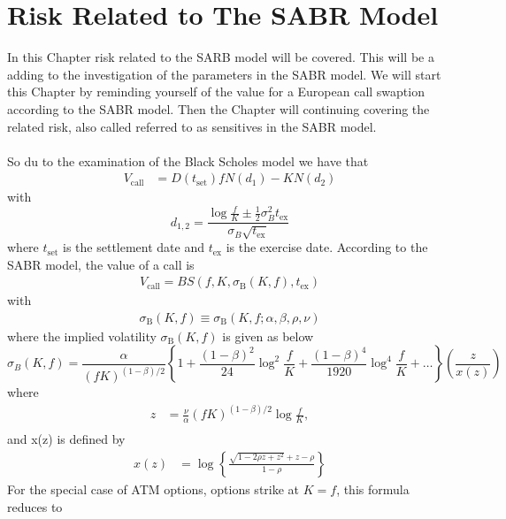 \section{Risk Related to The SABR Model} \label{risk_mang}
In this Chapter risk related to the SARB model will be covered. 
This will be a adding to the investigation of the parameters in the SABR model.
We will start this Chapter by  reminding yourself of the value for
a European call swaption according to the SABR model. 
Then the Chapter will continuing covering the related risk, also called referred to as sensitives in 
the SABR model. 
\\\\
So du to the examination of the Black Scholes model we have that \cite{Smile}
\begin{align}
    V_{\text{call}} &= D(t_{\text{set}})fN(d_1) - KN(d_2) \label{V_call} 
\end{align}
with
\begin{equation}
    d_{1,2} = \frac{\log \frac{f}{K} \pm \frac{1}{2}\sigma_B^2 t_{\text{ex}}}{\sigma_B \sqrt{t_{\text{ex}}}}
\end{equation}
where $t_{\text{set}}$ is the settlement date and $t_{\text{ex}}$ is the exercise date.
According to the SABR model, the value of a call is 
\begin{align}
    V_{\text{call}}= BS(f, K, \sigma_{\text{B}}(K,f),t_{\text{ex}})
\end{align}
with  
\begin{align}
    \sigma_{\text{B}}(K,f) \equiv \sigma_{\text{B}}(K,f;\alpha, \beta, \rho, \nu)
\end{align}
where the implied volatility $\sigma_{\text{B}}(K,f) $ is given as below
\begin{equation}
    \sigma_B(K, f) = \frac{\alpha}{(fK)^{(1-\beta)/2}} \left\{ 1 + \frac{(1-\beta)^2}{24} \log^2 \frac{f}{K} + \frac{(1-\beta)^4}{1920} \log^4 \frac{f}{K} + \ldots \right\} \left( \frac{z}{x(z)} \right)
    \label{eg_2}
\end{equation}
where
\begin{align}
    z &= \frac{\nu}{\alpha}(fK)^{(1-\beta)/2} \log \frac{f}{K}, \\
\end{align}
and x(z) is defined by
\begin{align}
    x(z) &= \log \left\{ \frac{\sqrt{1-2\rho z + z^2} + z - \rho}{1 - \rho} \right\}
\end{align}
For the special case of ATM options, options strike at $K = f$, this formula reduces to
